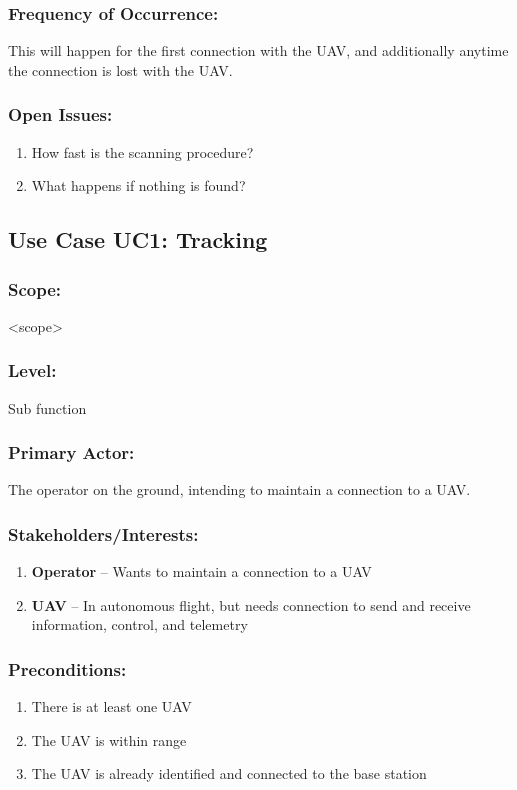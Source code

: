 \documentclass[ProductRequirements.tex]{subfiles}
\begin{document}
		\subsubsection*{Frequency of Occurrence:}
			This will happen for the first connection with the UAV, and additionally anytime the connection is lost with the UAV.
		\subsubsection*{Open Issues:}
			\begin{enumerate}\itemsep1pt
				\item How fast is the scanning procedure?
				\item What happens if nothing is found?
			\end{enumerate}		
	
	\subsection{Use Case UC1: Tracking}
	\subsubsection*{Scope:}
	<scope>
	\subsubsection*{Level:}
	Sub function
	\subsubsection*{Primary Actor:}
	The operator on the ground, intending to maintain a connection to a UAV.
	\subsubsection*{Stakeholders/Interests:}
	\begin{enumerate}\itemsep1pt
		\item \textbf{Operator} -- Wants to maintain a connection to a UAV
		\item \textbf{UAV} -- In autonomous flight, but needs connection to send and receive information, control, and telemetry
	\end{enumerate}
	\subsubsection*{Preconditions:}
	\begin{enumerate}\itemsep1pt
		\item There is at least one UAV
		\item The UAV is within range
		\item The UAV is already identified and connected to the base station
	\end{enumerate}
\end{document}
